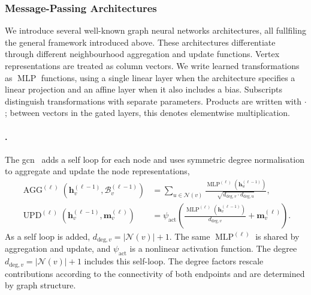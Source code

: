 \subsubsection{Message-Passing Architectures}
We introduce several well-known graph neural networks architectures, all fullfiling the general framework introduced above. These architectures differentiate through different neighbourhood aggregation and update functions. Vertex representations are treated as column vectors. We write learned transformations as $\operatorname{MLP}$ functions, using a single linear layer when the architecture specifies a linear projection and an affine layer when it also includes a bias. Subscripts distinguish transformations with separate parameters. Products are written with $\cdot$; between vectors in the gated layers, this denotes elementwise multiplication.

\paragraph{.}
The \gls{gcn}~\citep{KipWel17} adds a self loop for each node and uses symmetric degree normalisation to aggregate and update the node representations,
\begin{equation}
\label{eq:ch07:gcn}
\begin{aligned}
    \operatorname{AGG}^{(\ell)}\!\left(\mathbf{h}_v^{(\ell-1)},\mathcal B_v^{(\ell-1)}\right)
        &=\sum_{u\in \mathcal N(v)}
        \frac{\operatorname{MLP}^{(\ell)}\!\left(\mathbf{h}_u^{(\ell-1)}\right)}{\sqrt{d_{\mathrm{deg},v}\cdot d_{\mathrm{deg},u}}}, \\
    \operatorname{UPD}^{(\ell)}\!\left(\mathbf{h}_v^{(\ell-1)},\mathbf{m}_v^{(\ell)}\right)
        &=\psi_{\mathrm{act}}\!\left(\frac{\operatorname{MLP}^{(\ell)}\!\left(\mathbf{h}_v^{(\ell-1)}\right)}{d_{\mathrm{deg},v}}+\mathbf{m}_v^{(\ell)}\right).
\end{aligned}
\end{equation}
As a self loop is added, $d_{\mathrm{deg},v}=|\mathcal N(v)|+1$. The same $\operatorname{MLP}^{(\ell)}$ is shared by aggregation and update, and $\psi_{\mathrm{act}}$ is a nonlinear activation function.
The degree $d_{\mathrm{deg},v}=|\mathcal N(v)|+1$ includes this self-loop. The degree factors rescale contributions according to the connectivity of both endpoints and are determined by graph structure.

